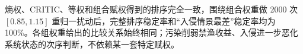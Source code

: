 熵权、CRITIC、等权和组合赋权得到的排序完全一致，围绕组合权重做 2000 次 $[0.85,1.15]$ 重归一扰动后，完整排序稳定率和“入侵情景最差”稳定率均为 100\%。各组权重给出的比较关系始终相同；污染削弱禁渔收益、入侵进一步恶化系统状态的次序判断，不依赖某一套特定赋权。
